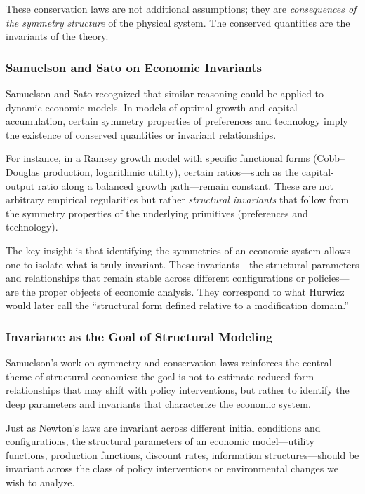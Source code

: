 \documentclass[12pt]{article}
\begin{document}
These conservation laws are not additional assumptions; they are \emph{consequences of the symmetry structure} of the physical system. The conserved quantities are the invariants of the theory.

\subsubsection{Samuelson and Sato on Economic Invariants}

Samuelson and Sato recognized that similar reasoning could be applied to dynamic economic models. In models of optimal growth and capital accumulation, certain symmetry properties of preferences and technology imply the existence of conserved quantities or invariant relationships.

For instance, in a Ramsey growth model with specific functional forms (Cobb--Douglas production, logarithmic utility), certain ratios---such as the capital-output ratio along a balanced growth path---remain constant. These are not arbitrary empirical regularities but rather \emph{structural invariants} that follow from the symmetry properties of the underlying primitives (preferences and technology).

The key insight is that identifying the symmetries of an economic system allows one to isolate what is truly invariant. These invariants---the structural parameters and relationships that remain stable across different configurations or policies---are the proper objects of economic analysis. They correspond to what Hurwicz would later call the ``structural form defined relative to a modification domain.''

\subsubsection{Invariance as the Goal of Structural Modeling}

Samuelson's work on symmetry and conservation laws reinforces the central theme of structural economics: the goal is not to estimate reduced-form relationships that may shift with policy interventions, but rather to identify the deep parameters and invariants that characterize the economic system.

Just as Newton's laws are invariant across different initial conditions and configurations, the structural parameters of an economic model---utility functions, production functions, discount rates, information structures---should be invariant across the class of policy interventions or environmental changes we wish to analyze.
\end{document}

